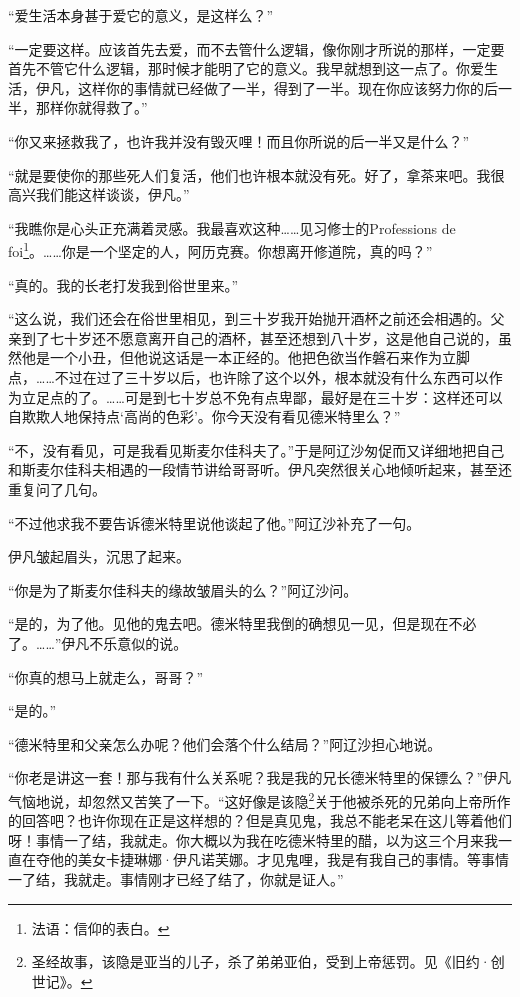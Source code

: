 \par “爱生活本身甚于爱它的意义，是这样么？”
\par “一定要这样。应该首先去爱，而不去管什么逻辑，像你刚才所说的那样，一定要首先不管它什么逻辑，那时候才能明了它的意义。我早就想到这一点了。你爱生活，伊凡，这样你的事情就已经做了一半，得到了一半。现在你应该努力你的后一半，那样你就得救了。”
\par “你又来拯救我了，也许我并没有毁灭哩！而且你所说的后一半又是什么？”
\par “就是要使你的那些死人们复活，他们也许根本就没有死。好了，拿茶来吧。我很高兴我们能这样谈谈，伊凡。”
\par “我瞧你是心头正充满着灵感。我最喜欢这种……见习修士的Professions de foi\footnote{法语：信仰的表白。}。……你是一个坚定的人，阿历克赛。你想离开修道院，真的吗？”
\par “真的。我的长老打发我到俗世里来。”
\par “这么说，我们还会在俗世里相见，到三十岁我开始抛开酒杯之前还会相遇的。父亲到了七十岁还不愿意离开自己的酒杯，甚至还想到八十岁，这是他自己说的，虽然他是一个小丑，但他说这话是一本正经的。他把色欲当作磐石来作为立脚点，……不过在过了三十岁以后，也许除了这个以外，根本就没有什么东西可以作为立足点的了。……可是到七十岁总不免有点卑鄙，最好是在三十岁：这样还可以自欺欺人地保持点‘高尚的色彩’。你今天没有看见德米特里么？”
\par “不，没有看见，可是我看见斯麦尔佳科夫了。”于是阿辽沙匆促而又详细地把自己和斯麦尔佳科夫相遇的一段情节讲给哥哥听。伊凡突然很关心地倾听起来，甚至还重复问了几句。
\par “不过他求我不要告诉德米特里说他谈起了他。”阿辽沙补充了一句。
\par 伊凡皱起眉头，沉思了起来。
\par “你是为了斯麦尔佳科夫的缘故皱眉头的么？”阿辽沙问。
\par “是的，为了他。见他的鬼去吧。德米特里我倒的确想见一见，但是现在不必了。……”伊凡不乐意似的说。
\par “你真的想马上就走么，哥哥？”
\par “是的。”
\par “德米特里和父亲怎么办呢？他们会落个什么结局？”阿辽沙担心地说。
\par “你老是讲这一套！那与我有什么关系呢？我是我的兄长德米特里的保镖么？”伊凡气恼地说，却忽然又苦笑了一下。“这好像是该隐\footnote{圣经故事，该隐是亚当的儿子，杀了弟弟亚伯，受到上帝惩罚。见《旧约·创世记》。}关于他被杀死的兄弟向上帝所作的回答吧？也许你现在正是这样想的？但是真见鬼，我总不能老呆在这儿等着他们呀！事情一了结，我就走。你大概以为我在吃德米特里的醋，以为这三个月来我一直在夺他的美女卡捷琳娜·伊凡诺芙娜。才见鬼哩，我是有我自己的事情。等事情一了结，我就走。事情刚才已经了结了，你就是证人。”
